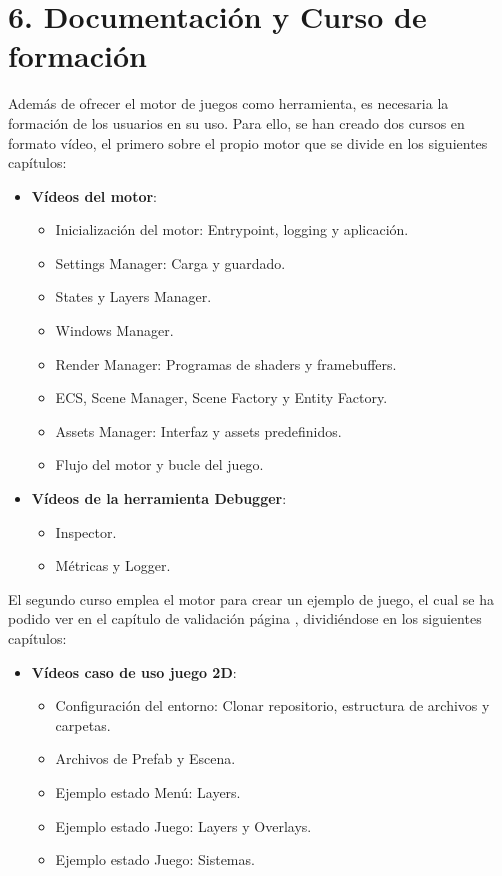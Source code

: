 \chapter*{6. Documentación y Curso de formación}\label{cap:course}

Además de ofrecer el motor de juegos como herramienta, es necesaria la formación de los usuarios en su uso. Para ello,
se han creado dos cursos en formato vídeo, el primero sobre el propio motor que se divide en los siguientes capítulos:
\begin{itemize}
	\item \textbf{Vídeos del motor}:
        \begin{itemize}
            \item Inicialización del motor: Entrypoint, logging y aplicación.
            \item Settings Manager: Carga y guardado.
            \item States y Layers Manager.
            \item Windows Manager.
            \item Render Manager: Programas de shaders y framebuffers.
            \item ECS, Scene Manager, Scene Factory y Entity Factory.
            \item Assets Manager: Interfaz y assets predefinidos.
            \item Flujo del motor y bucle del juego.
        \end{itemize}
    \item \textbf{Vídeos de la herramienta Debugger}:
        \begin{itemize}
            \item Inspector.
            \item Métricas y Logger.
        \end{itemize}
\end{itemize}
El segundo curso emplea el motor para crear un ejemplo de juego, el cual se ha podido ver en el capítulo de validación
página \pageref{cap:validation}, dividiéndose en los siguientes capítulos:
\begin{itemize}
    \item \textbf{Vídeos caso de uso juego 2D}:
        \begin{itemize}
            \item Configuración del entorno: Clonar repositorio, estructura de archivos y carpetas.
            \item Archivos de Prefab y Escena.
            \item Ejemplo estado Menú: Layers.
            \item Ejemplo estado Juego: Layers y Overlays.
            \item Ejemplo estado Juego: Sistemas.
        \end{itemize}
\end{itemize}
